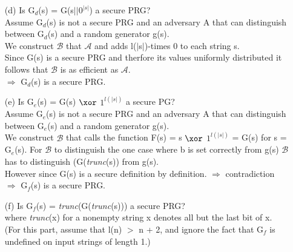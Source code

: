 \begin{itemize}
\item[(d)]
	Is G\(_{d}\)(s) = G(s\(\vert \vert\)\(0^{\vert s \vert}\)) a secure PRG? \\
	Assume  G\(_{d}\)(s)  is not a secure PRG and an adversary A that can distinguish between  G\(_{d}\)(s) and a random generator g(s).\\
	We construct \(\mathcal{B}\) that \(\mathcal{A}\)  and adds l(\(\vert\)s\(\vert\))-times 0 to each string s.\\
	Since G(s) is a secure PRG and therfore its values uniformly distributed it follows that \(\mathcal{B}\) is as efficient as \(\mathcal{A}\).\\
	\(\Rightarrow\) G\(_{d}\)(s) is a secure PRG.
\item[(e)]
	Is G\(_{e}\)(s) = G(s) \(\xor\) \(1^{ l(\vert s \vert)}\) a secure PG? \\
	Assume  G\(_{e}\)(s)  is not a secure PRG and an adversary A that can distinguish between  G\(_{e}\)(s) and a random generator g(s).\\
	We construct \(\mathcal{B}\) that calls the function F(s) = s \(\xor\) \(1^{ l(\vert s \vert)}\) = G(s) for s = G\(_{e}\)(s).
	For \(\mathcal{B}\) to distinguish the one case where b is set correctly from g(s) \(\mathcal{B}\) has to distinguish (G(\textit{trunc}(s)) from g(s).\\
	However since G(s) is a secure definition by definition.
	\(\Rightarrow\)  contradiction\\
	\(\Rightarrow\) G\(_{f}\)(s) is a secure PRG.
\item[(f)]
	Is G\(_{f}\)(s) = \textit{trunc}(G(\textit{trunc}(s))) a secure PRG? \\
	where \textit{trunc}(x) for a nonempty string x denotes all but the last bit of x. \\
	(For this part, assume that l(n) \(>\)  n + 2, and ignore the fact that G\(_{f}\) is undefined on input strings of length 1.) \\

\end{itemize}

